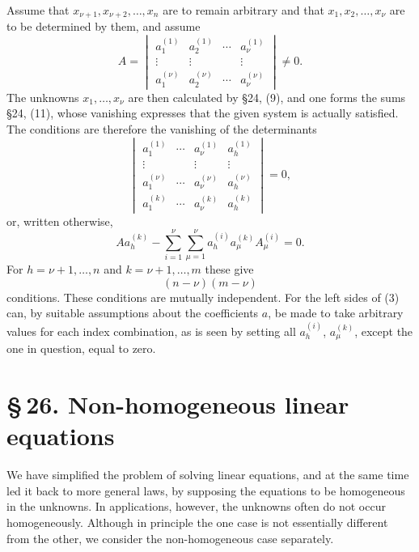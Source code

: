 \documentclass[11pt]{article}
\begin{document}
Assume that \(x_{\nu+1},x_{\nu+2},\ldots,x_n\) are to remain arbitrary and that \(x_1,x_2,\ldots,x_\nu\) are to be determined by them, and assume
\begin{equation}
        A=\begin{vmatrix}
        a_1^{(1)}&a_2^{(1)}&\cdots&a_\nu^{(1)}\\
        \vdots&\vdots&&\vdots\\
        a_1^{(\nu)}&a_2^{(\nu)}&\cdots&a_\nu^{(\nu)}
        \end{vmatrix}\ne0.
\tag{1}
\end{equation}
The unknowns \(x_1,
\ldots,x_\nu\) are then calculated by \S 24, (9), and one forms the sums \S 24, (11), whose vanishing expresses that the given system is actually satisfied.  The conditions are therefore the vanishing of the determinants
\begin{equation}
\begin{vmatrix}
        a_1^{(1)}&\cdots&a_\nu^{(1)}&a_h^{(1)}\\
        \vdots&&\vdots&\vdots\\
        a_1^{(\nu)}&\cdots&a_\nu^{(\nu)}&a_h^{(\nu)}\\
        a_1^{(k)}&\cdots&a_\nu^{(k)}&a_h^{(k)}
\end{vmatrix}=0,
\tag{2}
\end{equation}
or, written otherwise,
\begin{equation}
        A a_h^{(k)}-\sum_{i=1}^{\nu}\sum_{\mu=1}^{\nu}
        a_h^{(i)}a_\mu^{(k)}A_\mu^{(i)}=0.
\tag{3}
\end{equation}
For \(h=\nu+1,\ldots,n\) and \(k=\nu+1,\ldots,m\) these give
\begin{equation}
        (n-\nu)(m-\nu)
\tag{5}
\end{equation}
conditions.  These conditions are mutually independent.  For the left sides of (3) can, by suitable assumptions about the coefficients \(a\), be made to take arbitrary values for each index combination, as is seen by setting all \(a_h^{(i)}\), \(a_\mu^{(k)}\), except the one in question, equal to zero.

\section*{\S\,26. Non-homogeneous linear equations}

We have simplified the problem of solving linear equations, and at the same time led it back to more general laws, by supposing the equations to be homogeneous in the unknowns.  In applications, however, the unknowns often do not occur homogeneously.  Although in principle the one case is not essentially different from the other, we consider the non-homogeneous case separately.
\end{document}
